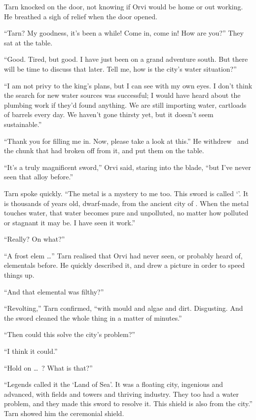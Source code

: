 Tarn knocked on the door, not knowing if Orvi would be home or out working.  He breathed a sigh of relief when the door opened.

``Tarn?  My goodness, it's been a while!  Come in, come in!  How are you?''  They sat at the table.

``Good.  Tired, but good.  I have just been on a grand adventure south.  But there will be time to discuss that later.  Tell me, how is the city's water situation?''

``I am not privy to the king's plans, but I can see with my own eyes.  I don't think the search for new water sources was successful; I would have heard about the plumbing work if they'd found anything.  We are still importing water, cartloads of barrels every day.  We haven't gone thirsty yet, but it doesn't seem sustainable.''

``Thank you for filling me in.  Now, please take a look at this.''  He withdrew \kildir\, and the chunk that had broken off from it, and put them on the table.

``It's a truly magnificent sword,'' Orvi said, staring into the blade, ``but I've never seen that alloy before.''

Tarn spoke quickly.  ``The metal is a mystery to me too.  This sword is called `\kildir'.  It is thousands of years old, dwarf-made, from the ancient city of \valdunmir.  When the metal touches water, that water becomes pure and unpolluted, no matter how polluted or stagnant it may be.  I have seen it work.''

``Really?  On what?''

``A frost elem \ldots'' Tarn realised that Orvi had never seen, or probably heard of, elementals before.  He quickly described it, and drew a picture in order to speed things up.

``And that elemental was filthy?''

``Revolting,'' Tarn confirmed, ``with mould and algae and dirt.  Disgusting.  And the sword cleaned the whole thing in a matter of minutes.''

``Then could this solve the city's problem?''

``I think it could.''

``Hold on \ldots\ \valdunmir?  What is that?''

``Legends called it the `Land of Sea'.  It was a floating city, ingenious and advanced, with fields and towers and thriving industry.  They too had a water problem, and they made this sword to resolve it.  This shield is also from the city.'' Tarn showed him the ceremonial shield.

